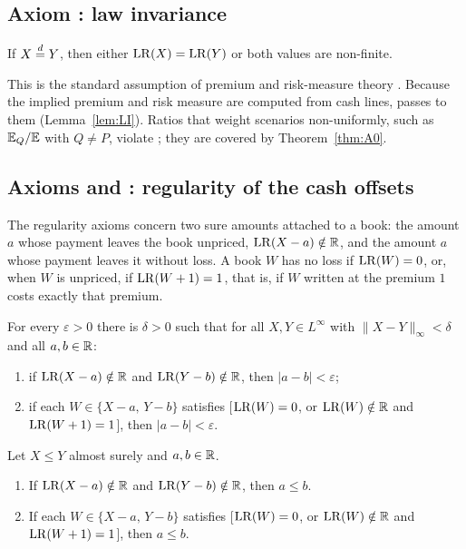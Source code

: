 \subsection{Axiom \axLI: law invariance}\label{sec:li}

\begin{axiom}[\axLI]\label{ax:LI}
If $X\overset{d}{=} Y$, then either $\mathrm{LR}(X)=\mathrm{LR}(Y)$ or both values are non-finite.
\end{axiom}

This is the standard assumption of premium and risk-measure theory \citep{wyp1997,kusuoka2001}. Because the
implied premium and risk measure are computed from cash lines, \axLI{} passes to them (Lemma~\ref{lem:LI}).
Ratios that weight scenarios non-uniformly, such as $\mathbb E_Q/\mathbb E$ with $Q\neq P$, violate \axLI; they are covered by
Theorem~\ref{thm:A0}.

\subsection{Axioms \axRC{} and \axRM: regularity of the cash offsets}\label{sec:reg}

The regularity axioms concern two sure amounts attached to a book: the amount $a$ whose payment leaves the book
unpriced, $\mathrm{LR}(X-a)\notin\mathbb R$, and the amount $a$ whose payment leaves it without loss. A book $W$ has no loss if
$\mathrm{LR}(W)=0$, or, when $W$ is unpriced, if $\mathrm{LR}(W+1)=1$, that is, if $W$ written at the premium $1$ costs exactly
that premium.

\begin{axiom}[\axRC]\label{ax:RC}
For every $\varepsilon>0$ there is $\delta>0$ such that for all $X,Y\in L^\infty$ with $\|X-Y\|_\infty<\delta$ and
all $a,b\in\mathbb R$:
\begin{enumerate}[label=(\roman*),nosep]
\item if $\mathrm{LR}(X-a)\notin\mathbb R$ and $\mathrm{LR}(Y-b)\notin\mathbb R$, then $|a-b|<\varepsilon$;
\item if each $W\in\{X-a,\,Y-b\}$ satisfies [$\mathrm{LR}(W)=0$, or $\mathrm{LR}(W)\notin\mathbb R$ and $\mathrm{LR}(W+1)=1$], then
  $|a-b|<\varepsilon$.
\end{enumerate}
\end{axiom}

\begin{axiom}[\axRM]\label{ax:RM}
Let $X\le Y$ almost surely and $a,b\in\mathbb R$.
\begin{enumerate}[label=(\roman*),nosep]
\item If $\mathrm{LR}(X-a)\notin\mathbb R$ and $\mathrm{LR}(Y-b)\notin\mathbb R$, then $a\le b$.
\item If each $W\in\{X-a,\,Y-b\}$ satisfies [$\mathrm{LR}(W)=0$, or $\mathrm{LR}(W)\notin\mathbb R$ and $\mathrm{LR}(W+1)=1$], then $a\le b$.
\end{enumerate}
\end{axiom}

